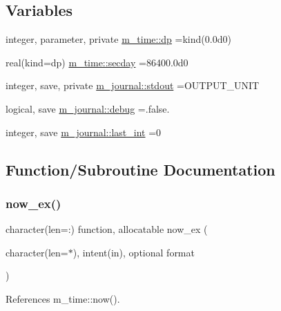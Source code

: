 \subsection*{Variables}
\begin{DoxyCompactItemize}
\item 
integer, parameter, private \mbox{\hyperlink{namespacem__time_a95f16e7435244d114f0a451625dc189a}{m\+\_\+time\+::dp}} =kind(0.\+0d0)
\item 
real(kind=dp) \mbox{\hyperlink{namespacem__time_a2c21a39cf2aa1f48e7f03d3542c0fab2}{m\+\_\+time\+::secday}} =86400.\+0d0
\item 
integer, save, private \mbox{\hyperlink{namespacem__journal_a664cf3fd85385b776d30ea589606ad1c}{m\+\_\+journal\+::stdout}} =O\+U\+T\+P\+U\+T\+\_\+\+U\+N\+IT
\item 
logical, save \mbox{\hyperlink{namespacem__journal_a6184fbcebdfa06f0a45ce4c699189b53}{m\+\_\+journal\+::debug}} =.false.
\item 
integer, save \mbox{\hyperlink{namespacem__journal_a47e8e34dc4072b04101027394d688519}{m\+\_\+journal\+::last\+\_\+int}} =0
\end{DoxyCompactItemize}


\subsection{Function/\+Subroutine Documentation}
\mbox{\label{M__journal_8f90_a09223e2da0c23850fad035407582fd68}} 
\subsubsection{\texorpdfstring{now\+\_\+ex()}{now\_ex()}}
{\footnotesize\ttfamily character(len=\+:) function, allocatable now\+\_\+ex (\begin{DoxyParamCaption}\item[{character(len=$\ast$), intent(in), optional}]{format }\end{DoxyParamCaption})\hspace{0.3cm}{\ttfamily [private]}}



References m\+\_\+time\+::now().

